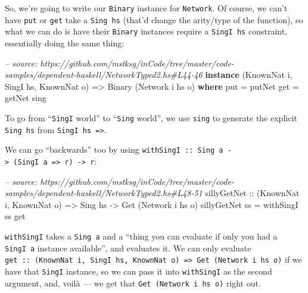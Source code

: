 \documentclass[]{article}
\newenvironment{Shaded}{}{}
\newcommand{\KeywordTok}[1]{\textcolor[rgb]{0.00,0.44,0.13}{\textbf{{#1}}}}
\newcommand{\DataTypeTok}[1]{\textcolor[rgb]{0.56,0.13,0.00}{{#1}}}
\newcommand{\CommentTok}[1]{\textcolor[rgb]{0.38,0.63,0.69}{\textit{{#1}}}}
\newcommand{\OtherTok}[1]{\textcolor[rgb]{0.00,0.44,0.13}{{#1}}}
\newcommand{\FunctionTok}[1]{\textcolor[rgb]{0.02,0.16,0.49}{{#1}}}
\newcommand{\NormalTok}[1]{{#1}}
\begin{document}
So, we're going to write our \texttt{Binary} instance for \texttt{Network}. Of
course, we can't have \texttt{put} or \texttt{get} take a \texttt{Sing\ hs}
(that'd change the arity/type of the function), so what we can do is have their
\texttt{Binary} instances require a \texttt{SingI\ hs} constraint, essentially
doing the same thing:

\begin{Shaded}
\begin{Highlighting}[]
\CommentTok{-- source: https://github.com/mstksg/inCode/tree/master/code-samples/dependent-haskell/NetworkTyped2.hs#L44-46}
\KeywordTok{instance} \NormalTok{(}\DataTypeTok{KnownNat} \NormalTok{i, }\DataTypeTok{SingI} \NormalTok{hs, }\DataTypeTok{KnownNat} \NormalTok{o) }\OtherTok{=>} \DataTypeTok{Binary} \NormalTok{(}\DataTypeTok{Network} \NormalTok{i hs o) }\KeywordTok{where}
    \NormalTok{put }\FunctionTok{=} \NormalTok{putNet}
    \NormalTok{get }\FunctionTok{=} \NormalTok{getNet sing}
\end{Highlighting}
\end{Shaded}

To go from ``\texttt{SingI} world'' to ``\texttt{Sing} world'', we use
\texttt{sing} to generate the explicit \texttt{Sing\ hs} from
\texttt{SingI\ hs\ =\textgreater{}}.

We can go ``backwards'' too by using
\texttt{withSingI\ ::\ Sing\ a\ -\textgreater{}\ (SingI\ a\ =\textgreater{}\ r)\ -\textgreater{}\ r}:

\begin{Shaded}
\begin{Highlighting}[]
\CommentTok{-- source: https://github.com/mstksg/inCode/tree/master/code-samples/dependent-haskell/NetworkTyped2.hs#L48-51}
\OtherTok{sillyGetNet ::} \NormalTok{(}\DataTypeTok{KnownNat} \NormalTok{i, }\DataTypeTok{KnownNat} \NormalTok{o)}
            \OtherTok{=>} \DataTypeTok{Sing} \NormalTok{hs}
            \OtherTok{->} \DataTypeTok{Get} \NormalTok{(}\DataTypeTok{Network} \NormalTok{i hs o)}
\NormalTok{sillyGetNet ss }\FunctionTok{=} \NormalTok{withSingI ss get}
\end{Highlighting}
\end{Shaded}

\texttt{withSingI} takes a \texttt{Sing\ a} and a ``thing you can evaluate if
only you had a \texttt{SingI\ a} instance available'', and evaluates it. We can
only evaluate
\texttt{get\ ::\ (KnownNat\ i,\ SingI\ hs,\ KnownNat\ o)\ =\textgreater{}\ Get\ (Network\ i\ hs\ o)}
if we have that \texttt{SingI} instance, so we can pass it into
\texttt{withSingI} as the second argument, and, voilà --- we get that
\texttt{Get\ (Network\ i\ hs\ o)} right out.
\end{document}
